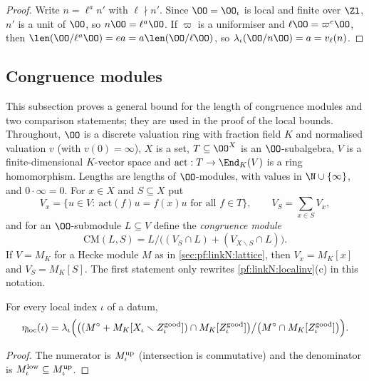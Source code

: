 \begin{proof}
Write $n=\ell^an'$ with $\ell\nmid n'$. Since $\OO=\OO_\iota$ is local and finite over $\Zl$, $n'$ is a unit of $\OO$, so
$n\OO=\ell^a\OO$. If $\varpi$ is a uniformiser and $\ell\OO=\varpi^e\OO$, then $\len(\OO/\ell^a\OO)=ea=a\len(\OO/\ell\OO)$,
so $\lambda_\iota(\OO/n\OO)=a=v_\ell(n)$.
\end{proof}

\subsection{Congruence modules}\label{sec:pf:linkN:congmod}

This subsection proves a general bound for the length of congruence modules and two comparison statements; they are used
in the proof of the local bounds. Throughout, $\OO$ is a discrete valuation ring with fraction field $K$ and normalised
valuation $v$ (with $v(0)=\infty$), $X$ is a set, $T\subseteq\OO^X$ is an $\OO$-subalgebra, $V$ is a finite-dimensional
$K$-vector space and $\mathrm{act}:T\to\End_K(V)$ is a ring homomorphism. Lengths are lengths of $\OO$-modules, with values in
$\N\cup\{\infty\}$, and $0\cdot\infty=0$. For $x\in X$ and $S\subseteq X$ put
\[
V_x=\{u\in V:\ \mathrm{act}(f)u=f(x)u\text{ for all }f\in T\},\qquad V_S=\sum_{x\in S}V_x,
\]
and for an $\OO$-submodule $L\subseteq V$ define the \emph{congruence module}
\[
\mathrm{CM}(L,S)=L\big/\bigl((V_S\cap L)+(V_{X\smallsetminus S}\cap L)\bigr).
\]
If $V=M_K$ for a Hecke module $M$ as in \cref{sec:pf:linkN:lattice}, then $V_x=M_K[x]$ and $V_S=M_K[S]$. The first statement
only rewrites \cref{pf:linkN:localinv}(c) in this notation.

\begin{lemma}\label{pf:linkN:etaLoceq}
For every local index $\iota$ of a datum,
\[
\eta_{\mathrm{loc}}(\iota)=\lambda_\iota\Bigl(\bigl((M^\circ+M_K[X_\iota\smallsetminus Z^{\mathrm{good}}_\iota])\cap M_K[Z^{\mathrm{good}}_\iota]\bigr)\big/
\bigl(M^\circ\cap M_K[Z^{\mathrm{good}}_\iota]\bigr)\Bigr).
\]
\end{lemma}

\begin{proof}
The numerator is $M^{\mathrm{up}}_\iota$ (intersection is commutative) and the denominator is $M^{\mathrm{low}}_\iota\subseteq M^{\mathrm{up}}_\iota$.
\end{proof}

